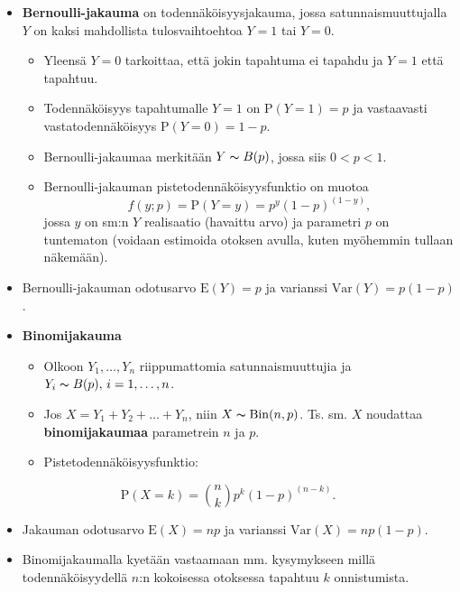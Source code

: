 \documentclass[
]{book}
\providecommand{\tightlist}{%
  \setlength{\itemsep}{0pt}\setlength{\parskip}{0pt}}
\begin{document}
\begin{itemize}
\tightlist
\item
  \textbf{Bernoulli-jakauma} on todennäköisyysjakauma, jossa satunnaismuuttujalla \(Y\) on kaksi mahdollista tulosvaihtoehtoa \(Y=1\) tai \(Y=0\).

  \begin{itemize}
  \tightlist
  \item
    Yleensä \(Y=0\) tarkoittaa, että jokin tapahtuma ei tapahdu ja \(Y=1\) että tapahtuu.
  \item
    Todennäköisyys tapahtumalle \(Y=1\) on \(\text{P}(Y=1)=p\) ja vastaavasti vastatodennäköisyys \(\text{P}(Y=0)=1-p\).
  \item
    Bernoulli-jakaumaa merkitään \(Y \thicksim B(p)\), jossa siis \(0 < p < 1\).
  \item
    Bernoulli-jakauman pistetodennäköisyysfunktio on muotoa
    \[
    f(y; p) = \text{P}(Y=y) = p^y (1-p)^{(1-y)},
    \]
    jossa \(y\) on sm:n \(Y\) realisaatio (havaittu arvo) ja parametri \(p\) on tuntematon (voidaan estimoida otoksen avulla, kuten myöhemmin tullaan näkemään).
  \end{itemize}
\item
  Bernoulli-jakauman odotusarvo \(\text{E}(Y)=p\) ja varianssi \(\mathrm{Var}(Y)=p (1-p)\).
\end{itemize}

\hfill\break

\begin{itemize}
\tightlist
\item
  \textbf{Binomijakauma}

  \begin{itemize}
  \tightlist
  \item
    Olkoon \(Y_1, \ldots, Y_n\) riippumattomia satunnaismuuttujia ja \(Y_i \thicksim B(p), \, i=1,\ldots,n\).
  \item
    Jos \(X = Y_1 + Y_2 + \ldots + Y_n\), niin \(X \thicksim \mathrm{Bin}(n,p)\). Ts. sm. \(X\) noudattaa \textbf{binomijakaumaa} parametrein \(n\) ja \(p\).
  \item
    Pistetodennäköisyysfunktio:
  \end{itemize}
\end{itemize}

\[
\text{P}(X=k) = \binom nk p^k (1-p)^{(n-k)}.
\]

\begin{itemize}
\tightlist
\item
  Jakauman odotusarvo \(\text{E}(X)=np\) ja varianssi \(\mathrm{Var}(X) = n p (1-p)\).
\item
  Binomijakaumalla kyetään vastaamaan mm. kysymykseen millä todennäköisyydellä \(n\):n kokoisessa otoksessa tapahtuu \(k\) onnistumista.
\end{itemize}
\end{document}
